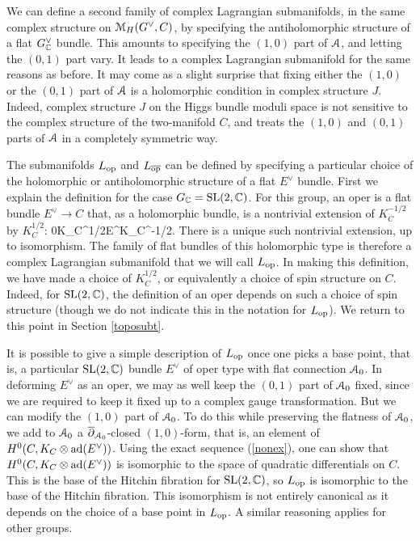\documentclass[11pt,a4paper]{article}
\begin{document}
We can define a second family of complex Lagrangian submanifolds, in the same complex structure on ${\mathcal M}_H(G^\vee,C)$, by specifying the antiholomorphic
structure of a flat $G^\vee_{\mathbb C}$ bundle.   This amounts to specifying the $(1,0)$ part of ${\mathcal A}$, and letting the $(0,1)$ part vary.    It leads to a complex
Lagrangian submanifold for the same reasons as before.   It may come as a slight surprise that fixing either the $(1,0)$ or the $(0,1)$ part of ${\mathcal A}$ is
a holomorphic condition in complex structure $J$.   Indeed, complex structure $J$ on the Higgs bundle moduli space is not sensitive to the complex
structure of the two-manifold $C$, and treats the $(1,0)$ and $(0,1)$ parts of ${\mathcal A}$ in a completely symmetric way.    

The submanifolds $L_{\mathrm{op}}$ and $L_{\overline{\mathrm{op}}}$ can be defined by specifying a particular choice of the holomorphic or antiholomorphic structure of a flat $E^\vee$ bundle.
First we explain the definition for the case $G_{\mathbb C}={\mathrm{SL}}(2,{\mathbb C})$. For this group, an oper  is a flat bundle  $E^\vee\to C$ that, as a holomorphic bundle, 
is  a nontrivial extension of $K_C^{-1/2}$ by $K_C^{1/2}$:
\be\label{nonex}0\to K_C^{1/2}\to E^\vee\to K_C^{-1/2}. \ee   
There is a unique such nontrivial extension, up to isomorphism.    The family of  flat bundles of this holomorphic type
 is therefore a complex Lagrangian submanifold
that we will call $L_{\mathrm{op}}$.   In making this definition, we have made a choice of $K_C^{1/2}$, or equivalently a choice of spin structure on $C$.
Indeed, for ${\mathrm{SL}}(2,{\mathbb C})$, the definition of an oper depends on such  a choice of spin structure (though we do not indicate this in the notation for $L_{\mathrm{op}}$).
We return to this point in Section \ref{toposubt}.

It is possible to give a simple description of $L_{\mathrm{op}}$ once one picks a base point, that is, a particular  ${\mathrm{SL}}(2,{\mathbb C})$ bundle $E^\vee$
of oper type with flat connection  ${\mathcal A}_0$.   In deforming $E^\vee$ as an oper, we may as well keep the $(0,1)$ part of ${\mathcal A}_0$ fixed, since we are required to 
keep it fixed up to a complex gauge transformation.  But we can modify the $(1,0)$ part of ${\mathcal A}_0$.  To do this while preserving the flatness of ${\mathcal A}_0$,
we  add to ${\mathcal A}_0$ a $\overline\partial_{{\mathcal A}_0}$-closed $(1,0)$-form, that is, an element of $H^0(C,K_C\otimes {\mathrm{ad}}(E^\vee))$.  Using the exact sequence
(\ref{nonex}), one can show that $H^0(C,K_C\otimes {\mathrm{ad}}(E^\vee))$ is isomorphic to the space of quadratic differentials on $C$.  This is the base of the Hitchin
fibration for ${\mathrm{SL}}(2,{\mathbb C})$, so $L_{\mathrm{op}}$ is isomorphic
 to the base of the Hitchin fibration.   This isomorphism is not entirely canonical as it depends on the choice of a base point in $L_{\mathrm{op}}$.   A similar
 reasoning applies for other groups.
 
\end{document}
